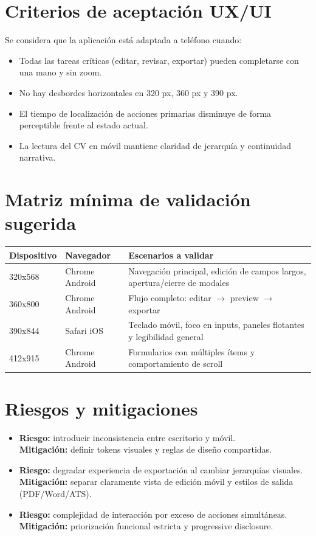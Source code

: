 \documentclass[12pt,a4paper]{article}
\begin{document}
\section{Criterios de aceptación UX/UI}
Se considera que la aplicación está adaptada a teléfono cuando:
\begin{itemize}[leftmargin=1.2cm]
  \item Todas las tareas críticas (editar, revisar, exportar) pueden completarse con una mano y sin zoom.
  \item No hay desbordes horizontales en 320 px, 360 px y 390 px.
  \item El tiempo de localización de acciones primarias disminuye de forma perceptible frente al estado actual.
  \item La lectura del CV en móvil mantiene claridad de jerarquía y continuidad narrativa.
\end{itemize}

\section{Matriz mínima de validación sugerida}
\begin{center}
\begin{tabular}{@{}p{3.2cm}p{4.2cm}p{6.6cm}@{}}
\toprule
\textbf{Dispositivo} & \textbf{Navegador} & \textbf{Escenarios a validar} \\
\midrule
320x568 & Chrome Android & Navegación principal, edición de campos largos, apertura/cierre de modales \\
360x800 & Chrome Android & Flujo completo: editar $\rightarrow$ preview $\rightarrow$ exportar \\
390x844 & Safari iOS & Teclado móvil, foco en inputs, paneles flotantes y legibilidad general \\
412x915 & Chrome Android & Formularios con múltiples ítems y comportamiento de scroll \\
\bottomrule
\end{tabular}
\end{center}

\section{Riesgos y mitigaciones}
\begin{itemize}[leftmargin=1.2cm]
  \item \textbf{Riesgo:} introducir inconsistencia entre escritorio y móvil.\\
  \textbf{Mitigación:} definir tokens visuales y reglas de diseño compartidas.
  \item \textbf{Riesgo:} degradar experiencia de exportación al cambiar jerarquías visuales.\\
  \textbf{Mitigación:} separar claramente vista de edición móvil y estilos de salida (PDF/Word/ATS).
  \item \textbf{Riesgo:} complejidad de interacción por exceso de acciones simultáneas.\\
  \textbf{Mitigación:} priorización funcional estricta y progressive disclosure.
\end{itemize}
\end{document}
